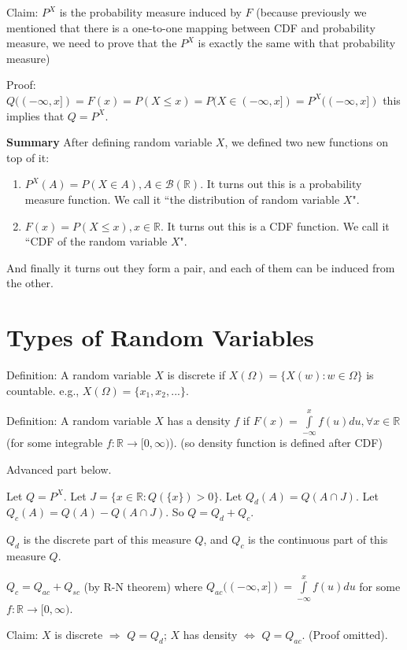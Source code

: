 \documentclass[12pt]{article}
\newcommand{\B}{\mathcal{B}}
\begin{document}

Claim: $P^X$ is the probability measure induced by $F$ (because previously we mentioned that
there is a one-to-one mapping between CDF and probability measure, we need to prove
that the $P^X$ is exactly the same with that probability measure)

Proof: $Q((-\infty,x])=F(x)=P(X\le x)=P(X\in(-\infty,x])=P^{X}((-\infty,x])$
this implies that $Q=P^X$.
\bigbreak

\textbf{Summary} After defining random variable $X$, we defined two new functions on top of it:
\begin{enumerate}
    \item $P^X(A) = P(X\in A), A\in\B(\mathbb{R})$. It turns out this is a probability measure function.
        We call it ``the distribution of random variable $X$".
    \item $F(x) = P(X\le x), x\in \mathbb{R}$. It turns out this is a CDF function.
        We call it ``CDF of the random variable $X$".
\end{enumerate}
And finally it turns out they form a pair, and each of them can be induced from the other.

\section{Types of Random Variables}

Definition: A random variable $X$ is discrete if $X(\Omega)=\{X(w):w\in\Omega\}$ is countable.
e.g., $X(\Omega)=\{x_1, x_2,...\}$.
\bigbreak

Definition: A random variable $X$ has a density $f$ if $F(x)=\int\limits_{-\infty}^x f(u)du, \forall x\in \mathbb{R}$ 
(for some integrable $f:\mathbb{R}\rightarrow [0,\infty)$). (so density function is defined after CDF)
\bigbreak

Advanced part below.

Let $Q=P^X$. Let $J=\{x\in\mathbb{R}:Q(\{x\})>0\}$. Let $Q_d(A)=Q(A\cap J)$.
Let $Q_c(A) = Q(A) - Q(A\cap J)$. So $Q= Q_d + Q_c$.

$Q_d$ is the discrete part of this measure $Q$,
and $Q_c$ is the continuous part of this measure $Q$.

$Q_c=Q_{ac} + Q_{sc}$ (by R-N theorem) where $Q_{ac}((-\infty,x])=\int\limits_{-\infty}^{x} f(u)du$
for some $f:\mathbb{R}\rightarrow [0,\infty)$.

Claim: $X$ is discrete $\Rightarrow$ $Q=Q_d$; $X$ has density $\Leftrightarrow$ $Q=Q_{ac}$. (Proof omitted).
\end{document}
